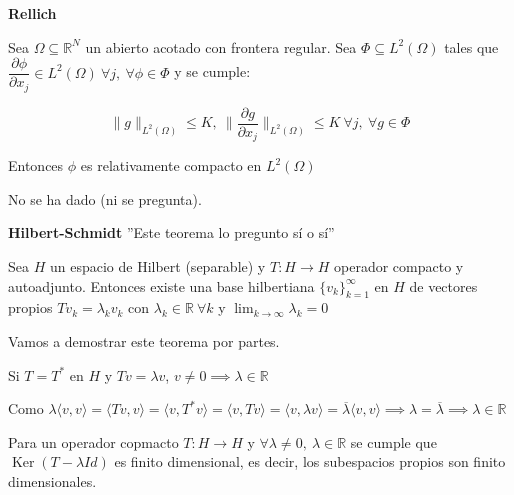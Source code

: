 \documentclass[openany]{book}
\begin{document}
\begin{theorem} \label{rellich}
    \textbf{Rellich}

    Sea $ \Omega  \subseteq  \mathbb{R}^{N}$ un abierto acotado con frontera regular. Sea $ \Phi \subseteq L^2(\Omega )$ tales que $ \dfrac{\partial \phi}{\partial x_j} \in L^2(\Omega ) \ \forall j, \ \forall \phi \in \Phi$ y se cumple:
    
    $$ \|g\|_{L^2(\Omega )} \leq  K,\ \| \dfrac{\partial g}{\partial x_j}\|_{L^2(\Omega )} \leq  K \ \forall j, \ \forall g \in \Phi $$

    Entonces $ \phi$ es relativamente compacto en $ L^2(\Omega )$

\end{theorem}

\begin{demonstration}
    No se ha dado (ni se pregunta).
\end{demonstration}

\begin{theorem}\label{hil-sch} \textbf{Hilbert-Schmidt}  ''Este teorema lo pregunto sí o sí''

    Sea $ H$ un espacio de Hilbert (separable) y $ T:H \to H$ operador compacto y autoadjunto. Entonces existe una base hilbertiana $ \{v_k\}_{k=1}^{\infty}$ en $ H$ de vectores propios $ Tv_k = \lambda _{k}v_k$ con $ \lambda_k \in \mathbb{R} \ \forall k $ y $ \lim_{k \to \infty}\lambda _{k} = 0$
\end{theorem}

Vamos a demostrar este teorema por partes.

\begin{proposition}
    Si $ T = T^* $ en $ H$ y $ Tv = \lambda  v$, $ v \ne 0 \implies \lambda  \in \mathbb{R}$
\end{proposition}

\begin{demonstration}
    Como  $ \lambda  \langle v, v \rangle = \langle Tv, v \rangle = \langle v, T^* v \rangle = \langle v,  Tv \rangle = \langle v, \lambda  v \rangle = \overline{\lambda } \langle v, v \rangle \implies \lambda  = \overline{\lambda } \implies \lambda \in \mathbb{R} $
\end{demonstration}

\begin{proposition}
    Para un operador copmacto $ T: H\to H$ y $ \forall \lambda  \ne 0,\ \lambda  \in \mathbb{R}$ se cumple que $ \operatorname{Ker}(T-\lambda Id)$ es finito dimensional, es decir, los subespacios propios son finito dimensionales.
\end{proposition}
\end{document}
